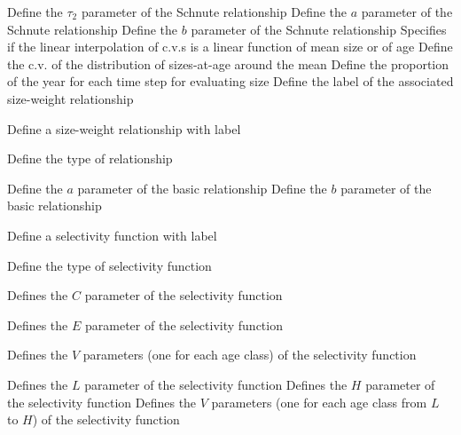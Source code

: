  {Define the $\tau_2$ parameter of the Schnute relationship}
 {Define the $a$ parameter of the Schnute relationship}
 {Define the $b$ parameter of the Schnute relationship}
 {Specifies if the linear interpolation of c.v.s is a linear function of mean size or of age}
 {Define the c.v. of the distribution of sizes-at-age around the mean}
 {Define the proportion of the year for each time step for evaluating size}
 {Define the label of the associated size-weight relationship}
\par{} {Define a size-weight relationship with label}\par
{} {Define the type of relationship}
\par\textbf{}\par
\par\textbf{}\par
{} {Define the $a$ parameter of the basic relationship}
 {Define the $b$ parameter of the basic relationship}
\par{} {Define a selectivity function with label}\par
{} {Define the type of selectivity function}
\par\textbf{}\par
{} {Defines the $C$ parameter of the selectivity function}
\par\textbf{}\par
{} {Defines the $E$ parameter of the selectivity function}
\par\textbf{}\par
{} {Defines the $V$ parameters (one for each age class) of the selectivity function}
\par\textbf{}\par
{} {Defines the $L$ parameter of the selectivity function}
 {Defines the $H$ parameter of the selectivity function}
 {Defines the $V$ parameters (one for each age class from $L$ to $H$) of the selectivity function}
\par\textbf{}\par
